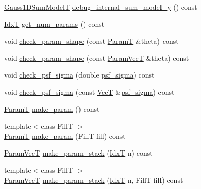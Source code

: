\begin{DoxyCompactItemize}
\item 
\hyperlink{classmappel_1_1Gauss2DModel_a6e41ec1749814a91648caf394edd4385}{Gauss1\+D\+Sum\+ModelT} \hyperlink{classmappel_1_1Gauss2DModel_a07e9c13f8a164f26f337fcc0c2f70374}{debug\+\_\+internal\+\_\+sum\+\_\+model\+\_\+y} () const 
\item 
\hyperlink{namespacemappel_ab17ec0f30b61ece292439d7ece81d3a8}{IdxT} \hyperlink{classmappel_1_1PointEmitterModel_a6fe8129bd24ab5c6620b3ab106b6c91a}{get\+\_\+num\+\_\+params} () const 
\item 
void \hyperlink{classmappel_1_1PointEmitterModel_a97a868e842302f670ed9f9bd49416771}{check\+\_\+param\+\_\+shape} (const \hyperlink{classmappel_1_1PointEmitterModel_a665ec6aea3aac139bb69a23c06d4b9a1}{ParamT} \&theta) const 
\item 
void \hyperlink{classmappel_1_1PointEmitterModel_a54b341a9bc0e32e2c8bbfe4ec0d8c9a1}{check\+\_\+param\+\_\+shape} (const \hyperlink{classmappel_1_1PointEmitterModel_add253b568d763f1513a810aac35de719}{Param\+VecT} \&theta) const 
\item 
void \hyperlink{classmappel_1_1PointEmitterModel_a01ce8d6358acbd2575be519dff1df89b}{check\+\_\+psf\+\_\+sigma} (double \hyperlink{classmappel_1_1Gauss2DModel_acb73f86ea080515e843f47be9502b271}{psf\+\_\+sigma}) const 
\item 
void \hyperlink{classmappel_1_1PointEmitterModel_a85780ca544a5ef5e0a62e74005081677}{check\+\_\+psf\+\_\+sigma} (const \hyperlink{namespacemappel_a2225ad69f358daa3f4f99282a35b9a3a}{VecT} \&\hyperlink{classmappel_1_1Gauss2DModel_acb73f86ea080515e843f47be9502b271}{psf\+\_\+sigma}) const 
\item 
\hyperlink{classmappel_1_1PointEmitterModel_a665ec6aea3aac139bb69a23c06d4b9a1}{ParamT} \hyperlink{classmappel_1_1PointEmitterModel_a1cd8ff64ce4132b6eaa8655696885749}{make\+\_\+param} () const 
\item 
{\footnotesize template$<$class FillT $>$ }\\\hyperlink{classmappel_1_1PointEmitterModel_a665ec6aea3aac139bb69a23c06d4b9a1}{ParamT} \hyperlink{classmappel_1_1PointEmitterModel_a5638e3df26cf84d7cf0f23112132682e}{make\+\_\+param} (FillT fill) const 
\item 
\hyperlink{classmappel_1_1PointEmitterModel_add253b568d763f1513a810aac35de719}{Param\+VecT} \hyperlink{classmappel_1_1PointEmitterModel_a6c7edc7f2549058df66472cd7647cf9b}{make\+\_\+param\+\_\+stack} (\hyperlink{namespacemappel_ab17ec0f30b61ece292439d7ece81d3a8}{IdxT} n) const 
\item 
{\footnotesize template$<$class FillT $>$ }\\\hyperlink{classmappel_1_1PointEmitterModel_add253b568d763f1513a810aac35de719}{Param\+VecT} \hyperlink{classmappel_1_1PointEmitterModel_abab975b04e09e6336a930b6d8fd8c267}{make\+\_\+param\+\_\+stack} (\hyperlink{namespacemappel_ab17ec0f30b61ece292439d7ece81d3a8}{IdxT} n, FillT fill) const 

\end{DoxyCompactItemize}
